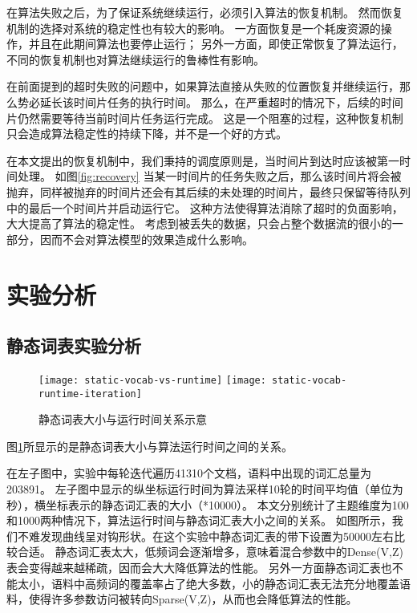 在算法失败之后，为了保证系统继续运行，必须引入算法的恢复机制。
然而恢复机制的选择对系统的稳定性也有较大的影响。
一方面恢复是一个耗废资源的操作，并且在此期间算法也要停止运行；
另外一方面，即使正常恢复了算法运行，不同的恢复机制也对算法继续运行的鲁棒性有影响。

在前面提到的超时失败的问题中，如果算法直接从失败的位置恢复并继续运行，那么势必延长该时间片任务的执行时间。
那么，在严重超时的情况下，后续的时间片仍然需要等待当前时间片任务运行完成。
这是一个阻塞的过程，这种恢复机制只会造成算法稳定性的持续下降，并不是一个好的方式。

在本文提出的恢复机制中，我们秉持的调度原则是，当时间片到达时应该被第一时间处理。
如图\ref{fig:recovery}
当某一时间片的任务失败之后，那么该时间片将会被抛弃，同样被抛弃的时间片还会有其后续的未处理的时间片，最终只保留等待队列中的最后一个时间片并启动运行它。
这种方法使得算法消除了超时的负面影响，大大提高了算法的稳定性。
考虑到被丢失的数据，只会占整个数据流的很小的一部分，因而不会对算法模型的效果造成什么影响。

\section{实验分析}

\subsection{静态词表实验分析}
\begin{figure}[htb]\centering
\texttt{[image: static-vocab-vs-runtime]}
\texttt{[image: static-vocab-runtime-iteration]}
\caption{静态词表大小与运行时间关系示意}
\label{fig:static-vocab-runtime}       %
\end{figure}

图\ref{fig:static-vocab-runtime}所显示的是静态词表大小与算法运行时间之间的关系。

在左子图中，实验中每轮迭代遍历41310个文档，语料中出现的词汇总量为203891。
左子图中显示的纵坐标运行时间为算法采样10轮的时间平均值（单位为秒），横坐标表示的静态词汇表的大小（*10000）。
本文分别统计了主题维度为100和1000两种情况下，算法运行时间与静态词汇表大小之间的关系。
如图所示，我们不难发现曲线呈对钩形状。在这个实验中静态词汇表的带下设置为50000左右比较合适。
静态词汇表太大，低频词会逐渐增多，意味着混合参数中的Dense(V,Z)表会变得越来越稀疏，因而会大大降低算法的性能。
另外一方面静态词汇表也不能太小，语料中高频词的覆盖率占了绝大多数，小的静态词汇表无法充分地覆盖语料，使得许多参数访问被转向Sparse(V,Z)，从而也会降低算法的性能。

